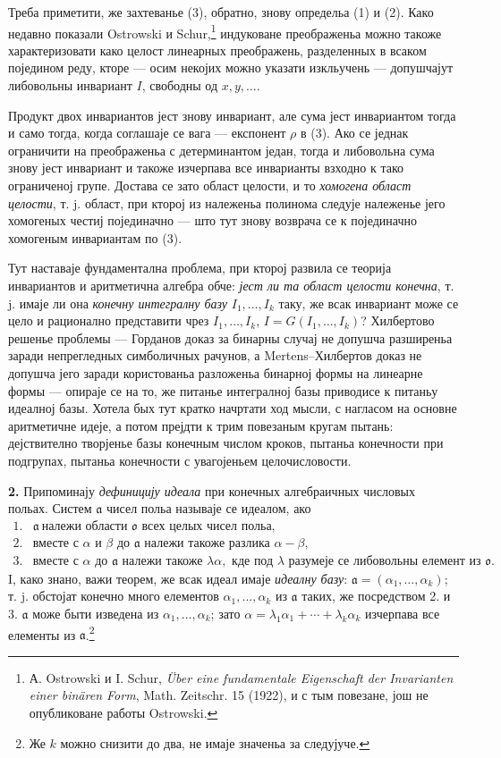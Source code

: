 ﻿\documentclass[11pt]{article}
\providecommand{\mo}{\mathfrak o}
\providecommand{\ma}{\mathfrak a}
\begin{document}
Треба приметити, же захтеванье (3), обратно, знову определьа (1) и (2). Како недавно показали Ostrowski и Schur,\footnote{А. Ostrowski и I. Schur, \emph{Über eine fundamentale Eigenschaft der Invarianten einer binären Form}, Math. Zeitschr. 15 (1922), и с тым повезане, још не опубликоване работы Ostrowski.} индуковане преображеньа можно такоже характеризовати како целост линеарных преображень, разделенных в всаком поједином реду, кторе --- осим некојих можно указати изкльучень --- допушчајут либовольны инвариант $I$, свободны од $x,y,\ldots$.

Продукт двох инвариантов јест знову инвариант, але сума јест инвариантом тогда и само тогда, когда соглашаје се вага --- експонент $\rho$ в (3). Ако се једнак ограничити на преображеньа с детерминантом један, тогда и либовольна сума знову јест инвариант и такоже изчерпава все инварианты взходно к тако ограниченој групе. Достава се зато област целости, и то \emph{хомогена област целости}, т. j. област, при кторој из належеньа полинома следује належенье јего хомогеных честиј појединачно --- што тут знову возврача се к појединачно хомогеным инвариантам по (3).

Тут наставаје фундаментална проблема, при кторој развила се теорија инвариантов и аритметична алгебра обче: \emph{јест ли та област целости конечна}, т. j. имаје ли она \emph{конечну интегралну базу} $I_1,\ldots,I_k$ таку, же всак инвариант може се цело и рационално представити чрез $I_1,\ldots,I_k$, $I=G(I_1,\ldots,I_k)$? Хилбертово решенье проблемы --- Горданов доказ за бинарны случај не допушча разширеньа заради непрегледных симболичных рачунов, а Mertens--Хилбертов доказ не допушча јего заради користованьа разложеньа бинарној формы на линеарне формы --- опираје се на то, же питанье интегралној базы приводисе к питаньу идеалној базы. Хотела бых тут кратко начртати ход мысли, с нагласом на основне аритметичне идеје, а потом прејдти к трим повезаным кругам пытань: дејствително творјенье базы конечным числом кроков, пытаньа конечности при подгрупах, пытаньа конечности с увагојеньем целочисловости.

\textbf{2.} Припоминају \emph{дефиницију идеала} при конечных алгебраичных числовых польах. Систем $\ma$ чисел польа называје се идеалом, ако
\[
\begin{array}{ll}
1.& \ma\ \text{належи области }\mo\text{ всех целых чисел польа},\\
2.& \text{вместе с }\alpha\text{ и }\beta\text{ до }\ma\text{ належи такоже разлика }\alpha-\beta,\\
3.& \text{вместе с }\alpha\text{ до }\ma\text{ належи такоже }\lambda\alpha,\text{ кде под }\lambda
\text{ разумеје се либовольны елемент из }\mo.
\end{array}
\]
I, како знано, важи теорем, же всак идеал имаје \emph{идеалну базу}: $\ma=(\alpha_1,\ldots,\alpha_k)$; т. j. обстојат конечно много елементов $\alpha_1,\ldots,\alpha_k$ из $\ma$ таких, же посредством 2. и 3. $\ma$ може быти изведена из $\alpha_1,\ldots,\alpha_k$; зато $\alpha=\lambda_1\alpha_1+\cdots+\lambda_k\alpha_k$ изчерпава все елементы из $\ma$.\footnote{Же $k$ можно снизити до два, не имаје значеньа за следујуче.}
\end{document}
